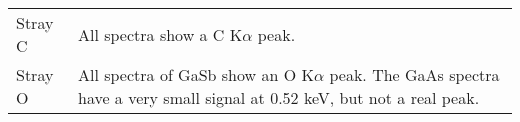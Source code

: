 \begin{table}[phtb]
\begin{center}
\begin{tabular}{p{3.5cm}p{8.5cm}}
			Stray C                                    & All spectra show a C K$\alpha$ peak.                                                                                                                                                                               \\
			Stray O                                    & All spectra of GaSb show an O K$\alpha$ peak. The GaAs spectra have a very small signal at 0.52 keV, but not a real peak.                                                                                          \\
			\hline
		\end{tabular}
	\end{center}
\end{table}
